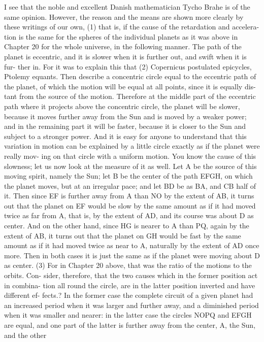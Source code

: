 \documentclass{article}
\begin{document}
{{{{{{{{{{{{{{{{{{{{{{{{{{{{{{{{{{{{{{{{{{{{{{{{{{{{{{{{{{{{{{{{{{{{{{{{{{{{{{{{{{{{{{{{{{{{{{{{{{{{{{{{{{{{{{{{{{{{{{{{{{{{{{{{{{{{{{{{{{{{{{{{{{{{{{{{{{{{{{{{{{{{{{{{I see that the noble and excellent Danish mathematician Tycho Brahe is of the
same opinion. However, the reason and the means are shown more clearly by
these writings of our own, (1) that is, if the cause of the retardation and accelera-
tion is the same for the spheres of the individual planets as it was above in
Chapter 20 for the whole universe, in the following manner. The path of the
planet is eccentric, and it is slower when it is further out, and swift when it is fur-
ther in. For it was to explain this that (2) Copernicus postulated epicycles,
Ptolemy equants. Then describe a concentric circle equal to the eccentric path of
the planet, of which the motion will be equal at all points, since it is equally dis-
tant from the source of the motion. Therefore at the middle part of the eccentric
path where it projects above the concentric circle, the planet will be slower,
because it moves further away from the Sun and is moved by a weaker power; and
in the remaining part it will be faster, because it is closer to the Sun and subject to
a stronger power. And it is easy for anyone to understand that this variation in
motion can be explained by a little circle exactly as if the planet were really mov-
ing on that circle with a uniform motion. You know the cause of this slowness; let
us now look at the measure of it as well. Let A be the source of this moving spirit,
namely the Sun; let B be the center of the path EFGH, on which the planet
moves, but at an irregular pace; and let BD be as BA, and CB half of it. Then
since EF is further away from A than NO by the extent of AB, it turns out that
the planet on EF would be slow by the same amount as if it had moved twice as
far from A, that is, by the extent of AD, and its course was about D as center.
And on the other hand, since HG is nearer to A than PQ, again by the extent of
AB, it turns out that the planet on GH would be fast by the same amount as if it
had moved twice as near to A, naturally by the extent of AD once more. Then in
both cases it is just the same as if the planet were moving about D as center. (3)
For in Chapter 20 above, that was the ratio of the motions to the orbits. Con-
sider, therefore, that the two causes which in the former position act in combina-
tion all round the circle, are in the latter position inverted and have different ef-
fects.? In the former case the complete circuit of a given planet had an increased
period when it was larger and further away, and a diminished period when it was
smaller and nearer: in the latter case the circles NOPQ and EFGH are equal, and
one part of the latter is further away from the center, A, the Sun, and the other
}}}}}}}}}}}}}}}}}}}}}}}}}}}}}}}}}}}}}}}}}}}}}}}}}}}}}}}}}}}}}}}}}}}}}}}}}}}}}}}}}}}}}}}}}}}}}}}}}}}}}}}}}}}}}}}}}}}}}}}}}}}}}}}}}}}}}}}}}}}}}}}}}}}}}}}}}}}}}}}}}}}}}}}}
\end{document}

